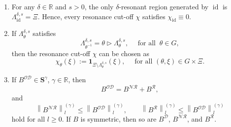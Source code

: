 \documentclass[AHL,Unicode,longabstracts,published]{cedram}
\DeclareMathOperator{\id}{id}
\newcommand{\R}{\mathbb R}
\newcommand{\CD}{\mathcal{D}}
\newcommand{\CN}{\mathcal{N}}
\newcommand{\CO}{\mathcal{O}}
\newcommand{\CR}{\mathcal{R}}
\newcommand{\CNR}{{\CN\!\CR}}
\newcommand{\bone}{\boldsymbol 1}
\newcommand{\BS}{\mathbf S}
\newcommand{\rco}{\chi}
\newcommand{\act}{\triangleright}
\newcommand{\snorm}[3]{\left\| #1\right\|_{#3}^{(#2)}}
\newcommand*{\romanenumi}{\renewcommand*{\theenumi}{\roman{enumi}}}
\begin{document}
\begin{rema}\label{rem:res}\leavevmode
\begin{enumerate}\romanenumi
\item For any $\delta\in\R$ and $s>0$, the only $\delta$-resonant region generated by $\id$ is $\Lambda_{\id}^{\delta,s}=\Xi$. Hence, every resonance cut-off $\rco$ satisfies $\rco_{\id}\equiv 0$.
\item \label{item:remrescutoff}
If $\Lambda_\theta^{\delta,s}$ satisfies
\begin{equation}
\Lambda_{\theta^{-1}}^{\delta,s}=\theta\act\Lambda_{\theta}^{\delta,s},\quad \text{ for all } \ \theta\in G,
\end{equation}
then the resonance cut-off $\rco$ can be chosen as
\begin{equation}\label{eq:rescutoffstandard}
\rco_\theta(\xi):=\bone_{\Xi\setminus\Lambda_{\theta}^{\delta,s}}(\xi), \quad \text{ for all } (\theta,\xi)\in G\times\Xi.
\end{equation}
\item \label{item:remres}
If $B^{\CO\CD}\in\BS^\gamma$, $\gamma\in\R$, then
\begin{equation}
B^{\CO\CD}=B^{\CNR}+B^{\CR},
\end{equation}
and
\begin{equation}\label{eq:estpartbyfull}
\snorm{B^{\CNR}}{\gamma}{l}\leq\snorm{B^{\CO\CD}}{\gamma}{l},\qquad
\snorm{B^{\CR}}{\gamma}{l}\leq\snorm{B^{\CO\CD}}{\gamma}{l}
\end{equation}
hold for all $l\geq 0$. If $B$ is symmetric, then so are $B^{\CD}$, $B^{\CNR}$, and $B^{\CR}$.
\end{enumerate}
\end{rema}
\end{document}
